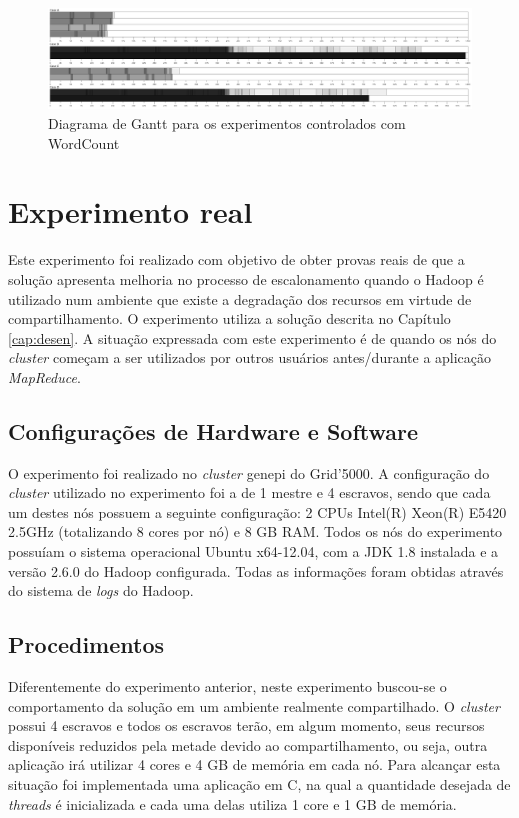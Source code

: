 \begin{figure}[!ht]
	\centering
	\includegraphics[width=1\textwidth]{figuras/todos-WC.png}
	\caption{Diagrama de Gantt para os experimentos controlados com WordCount}
	\label{fig:exp1WC}
\end{figure}

\section{Experimento real}
\label{sec:expReal}
Este experimento foi realizado com objetivo de obter provas reais de que a solução apresenta melhoria no processo de escalonamento quando o Hadoop é utilizado num ambiente que existe a degradação dos recursos em virtude de compartilhamento. O experimento utiliza a solução descrita no Capítulo \ref{cap:desen}. A situação expressada com este experimento é de quando os nós do \textit{cluster} começam a ser utilizados por outros usuários antes/durante a aplicação \textit{MapReduce}.

\subsection{Configurações de Hardware e Software}
O experimento foi realizado no \textit{cluster} genepi do Grid'5000. A configuração do \textit{cluster} utilizado no experimento foi a de 1 mestre e 4 escravos, sendo que cada um destes nós possuem a seguinte configuração: 2 CPUs Intel(R) Xeon(R) E5420 2.5GHz (totalizando 8 cores por nó) e 8 GB RAM. Todos os nós do experimento possuíam o sistema operacional Ubuntu x64-12.04, com a JDK 1.8 instalada e a versão 2.6.0 do Hadoop configurada. Todas as informações foram obtidas através do sistema de \textit{logs} do Hadoop.

\subsection{Procedimentos}
Diferentemente do experimento anterior, neste experimento buscou-se o comportamento da solução em um ambiente realmente compartilhado. O \textit{cluster} possui 4 escravos e todos os escravos terão, em algum momento, seus recursos disponíveis reduzidos pela metade devido ao compartilhamento, ou seja, outra aplicação irá utilizar 4 cores e 4 GB de memória em cada nó. Para alcançar esta situação foi implementada uma aplicação em C, na qual a quantidade desejada de \textit{threads} é inicializada e cada uma delas utiliza 1 core e 1 GB de memória.


